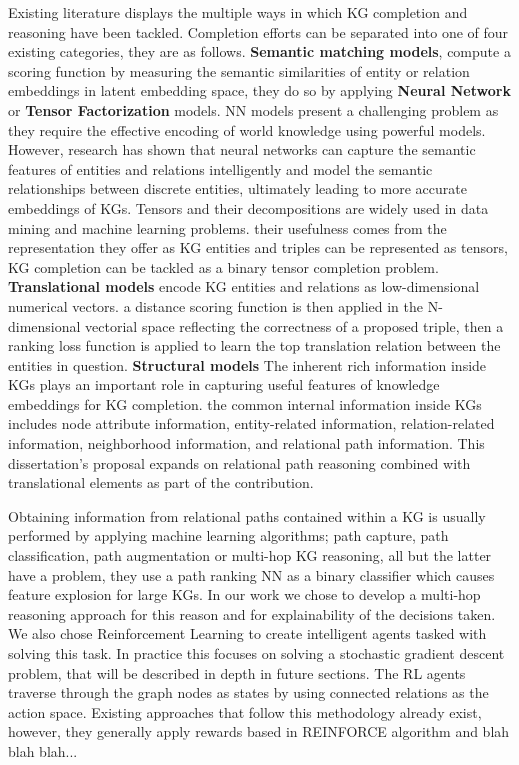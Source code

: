 Existing literature displays the multiple ways in which KG completion and reasoning have been tackled. Completion efforts can be separated into one of four existing categories\cite{shen2022comprehensive}, they are as follows.
\textbf{Semantic matching models}, compute a scoring function by measuring the semantic similarities of entity or relation embeddings in latent embedding space, they do so by applying \textbf{Neural Network} or \textbf{Tensor Factorization} models. 
NN models \cite{} present a challenging problem as they require the effective encoding of world knowledge using powerful models. However, research has shown that neural networks can capture the semantic features of entities and relations intelligently and model the semantic relationships between discrete entities, ultimately leading to more accurate embeddings of KGs.
Tensors\cite{} and their decompositions are widely used in data mining and machine learning problems. their usefulness comes from the representation they offer as KG entities and triples can be represented as tensors, KG completion can be tackled as a binary tensor completion problem\cite{shen2022comprehensive}.
\textbf{Translational models}\cite{} encode KG entities and relations as low-dimensional numerical vectors. a distance scoring function is then applied in the N-dimensional vectorial space reflecting the correctness of a proposed triple, then a ranking loss function is applied to learn the top translation relation between the entities in question.
\textbf{Structural models}\cite{} The inherent rich information inside KGs plays an important role in capturing useful features of knowledge embeddings for KG completion. the common internal information inside KGs includes node attribute information\cite{}, entity-related information\cite{}, relation-related information\cite{}, neighborhood information\cite{}, and relational path information\cite{}. This dissertation's proposal expands on relational path reasoning combined with translational elements as part of the contribution.

Obtaining information from relational paths contained within a KG is usually performed by applying machine learning algorithms; path capture\cite{}, path classification, path augmentation or multi-hop KG reasoning, all but the latter have a problem, they use a path ranking NN as a binary classifier which causes feature explosion for large KGs. In our work we chose to develop a multi-hop reasoning approach for this reason and for explainability of the decisions taken.
We also chose Reinforcement Learning to create intelligent agents tasked with solving this task. In practice this focuses on solving a stochastic gradient descent problem, that will be described in depth in future sections.
The RL agents traverse through the graph nodes as states by using connected relations as the action space.
Existing approaches that follow this methodology already exist, however, they generally apply rewards based in REINFORCE algorithm and blah blah blah...

